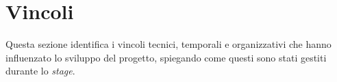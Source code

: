 \section{Vincoli}
Questa sezione identifica i vincoli tecnici, temporali e organizzativi che hanno influenzato lo sviluppo del progetto, spiegando come questi sono stati gestiti durante lo \textit{stage}.